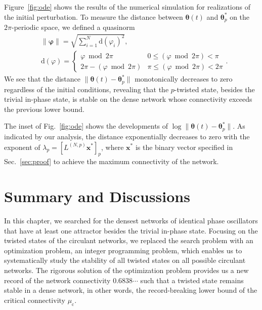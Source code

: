 Figure~\ref{fig:ode} shows the results of the numerical simulation for realizations of the initial perturbation. To measure the distance between $\bm{\theta}(t)$ and $\bm{\theta}_{p}^{\ast}$ on the $2\pi$-periodic space, we defined a quasinorm
\begin{align}
    &\|\bm{\varphi}\| = \sqrt{\sum_{i=1}^{N}\mathrm{d}(\varphi_{i})^{2}},\\
    &\mathrm{d}(\varphi) = 
    \begin{cases}
        \varphi\bmod 2\pi & 0\leq\left(\varphi\bmod 2\pi\right) < \pi\\
        2\pi - (\varphi\bmod 2\pi) & \pi\leq\left(\varphi\bmod 2\pi\right) < 2\pi
    \end{cases} .
\end{align}
We see that the distance $\|\bm{\theta}(t)-\bm{\theta}^{\ast}_{p}\|$ monotonically decreases to zero regardless of the initial conditions, revealing that the $p$-twisted state, besides the trivial in-phase state, is stable on the dense network whose connectivity exceeds the previous lower bound.

The inset of Fig.~\ref{fig:ode} shows the developments of $\log\|\bm{\theta}(t)-\bm{\theta}^{\ast}_{p}\|$. As indicated by our analysis, the distance exponentially decreases to zero with the exponent of $\lambda_{p}=\left[L^{(N,p)}\bm{x}^{\ast}\right]_{p}$, where $\bm{x}^{\ast}$ is the binary vector specified in Sec.~\ref{sec:proof} to achieve the maximum connectivity of the network.

\section{Summary and Discussions}
\label{sec:paper03_conclusion}
In this chapter, we searched for the densest networks of identical phase oscillators that have at least one attractor besides the trivial in-phase state. Focusing on the twisted states of the circulant networks, we replaced the search problem with an optimization problem, an integer programming problem, which enables us to systematically study the stability of all twisted states on all possible circulant networks. The rigorous solution of the optimization problem provides us a new record of the network connectivity $0.6838\cdots$ such that a twisted state remains stable in a dense network, in other words, the record-breaking lower bound of the critical connectivity $\mu_{\mathrm{c}}$.

